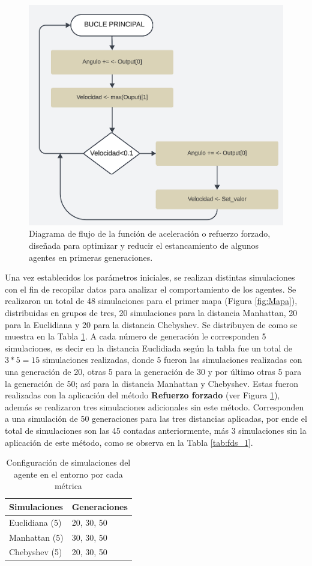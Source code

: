 \documentclass[conference]{IEEEtran}
\begin{document}
\begin{figure}
    \centering
    \includegraphics[width=0.7\linewidth]{images/reforce.png}
    \caption{Diagrama de flujo de la función de aceleración o refuerzo forzado, diseñada para optimizar y reducir el estancamiento de algunos agentes en primeras generaciones.}
    \label{fig:reforce}
\end{figure}

Una vez establecidos los parámetros iniciales, se realizan distintas simulaciones con el fin de recopilar datos para analizar el comportamiento de los agentes. Se realizaron un total de 48 simulaciones para el primer mapa (Figura \ref{fig:Mapa}), distribuidas en grupos de tres, 20 simulaciones para la distancia Manhattan, 20 para la Euclidiana y 20 para la distancia Chebyshev. Se distribuyen de como se muestra en la Tabla \ref{tab:fds}. A cada número de generación le corresponden 5 simulaciones, es decir en la distancia Euclidiada según la tabla fue un total de $3*5 = 15$ simulaciones realizadas, donde 5 fueron las simulaciones realizadas con una generación de 20, otras 5 para la generación de 30 y por último otras 5 para la generación de 50; así para la distancia Manhattan y Chebyshev. Estas fueron realizadas con la aplicación del método \textbf{Refuerzo forzado} (ver Figura \ref{fig:reforce}), además se realizaron tres simulaciones adicionales sin este método. Corresponden a una simulación de 50 generaciones para las tres distancias aplicadas, por ende el total de simulaciones son las 45 contadas anteriormente, más 3 simulaciones sin la aplicación de este método, como se observa en la Tabla \ref{tab:fds_1}.

\begin{table}
\centering
\caption{Configuración de simulaciones del agente en el entorno por cada métrica}
\label{tab:fds}
\begin{tabular}{ll}
\toprule
\textbf{Simulaciones} & \textbf{Generaciones} \\
\midrule
Euclidiana (5)   &  20, 30, 50 \\
Manhattan (5)    & 30, 30, 50 \\
Chebyshev (5)    & 20, 30, 50 \\
\bottomrule
\end{tabular}
\end{table}
\end{document}
